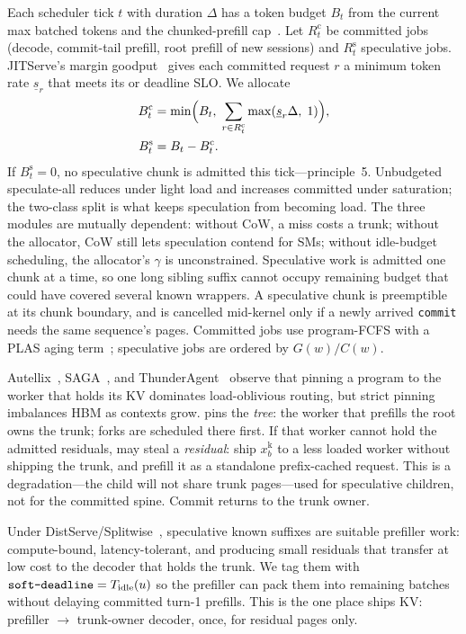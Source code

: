 Each scheduler tick $t$ with duration $\Delta$ has a token budget $B_t$ from the current max batched tokens and the chunked-prefill cap~\cite{sarathi}.
Let $R^{\mathrm{c}}_t$ be committed jobs (decode, commit-tail prefill, root prefill of new sessions) and $R^{\mathrm{s}}_t$ speculative jobs.
JITServe's margin goodput~\cite{jitserve} gives each committed request $r$ a minimum token rate $\underline{s}_r$ that meets its \tbt{} or deadline SLO.
We allocate
\begin{align}
B^{\mathrm{c}}_t &= \min\Bigl(B_t,\; \sum_{r\in R^{\mathrm{c}}_t} \max(\underline{s}_r\Delta,\; 1)\Bigr), \label{eq:bc}\\
B^{\mathrm{s}}_t &= B_t - B^{\mathrm{c}}_t. \label{eq:bs}
\end{align}
If $B^{\mathrm{s}}_t=0$, no speculative chunk is admitted this tick---principle~5.
Unbudgeted speculate-all reduces \ttft{} under light load and increases committed \tbt{} under saturation; the two-class split is what keeps speculation from becoming load.
The three modules are mutually dependent: without CoW, a miss costs a trunk; without the allocator, CoW still lets speculation contend for SMs; without idle-budget scheduling, the allocator's $\gamma$ is unconstrained.
Speculative work is admitted one chunk at a time, so one long sibling suffix cannot occupy remaining budget that could have covered several known wrappers.
A speculative chunk is preemptible at its chunk boundary, and is cancelled mid-kernel only if a newly arrived \texttt{commit} needs the same sequence's pages.
Committed jobs use program-FCFS with a PLAS aging term~\cite{autellix,continuum}; speculative jobs are ordered by $G(w)/C(w)$.

Autellix~\cite{autellix}, SAGA~\cite{saga}, and ThunderAgent~\cite{thunderagent} observe that pinning a program to the worker that holds its KV dominates load-oblivious routing, but strict pinning imbalances HBM as contexts grow.
\sys pins the \emph{tree}: the worker that prefills the root owns the trunk; forks are scheduled there first.
If that worker cannot hold the admitted residuals, \sys may steal a \emph{residual}: ship $x^{\mathrm{k}}_b$ to a less loaded worker without shipping the trunk, and prefill it as a standalone prefix-cached request.
This is a degradation---the child will not share trunk pages---used for speculative children, not for the committed spine.
Commit returns to the trunk owner.

Under DistServe/Splitwise~\cite{distserve,splitwise}, speculative known suffixes are suitable prefiller work: compute-bound, latency-tolerant, and producing small residuals that transfer at low cost to the decoder that holds the trunk.
We tag them with $\texttt{soft-deadline}=T_{\mathrm{idle}}(u)$ so the prefiller can pack them into remaining batches without delaying committed turn-1 prefills.
This is the one place \sys ships KV: prefiller $\to$ trunk-owner decoder, once, for residual pages only.

